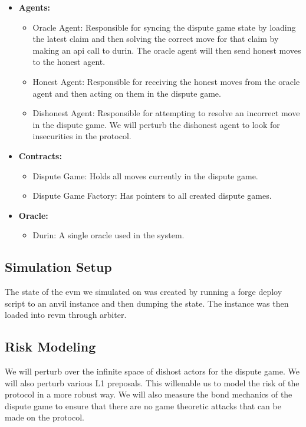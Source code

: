 \documentclass[14pt]{extarticle}
\begin{document}
\begin{itemize}
\item \textbf{Agents:}
  \begin{itemize}
  \item Oracle Agent: Responsible for syncing the dispute game state by loading the latest claim and then solving the correct move for that claim by making an api call to durin. The oracle agent will then send honest moves to the honest agent.
  \item Honest Agent: Responsible for receiving the honest moves from the oracle agent and then acting on them in the dispute game.
  \item Dishonest Agent: Responsible for attempting to resolve an incorrect move in the dispute game. We will perturb the dishonest agent to look for insecurities in the protocol.
  \end{itemize}
\item \textbf{Contracts:}
  \begin{itemize}
  \item Dispute Game: Holds all moves currently in the dispute game.
  \item Dispute Game Factory: Has pointers to all created dispute games.
  \end{itemize}
\item \textbf{Oracle:}
  \begin{itemize}
  \item Durin: A single oracle used in the system.
  \end{itemize}
\end{itemize}


\subsection{Simulation Setup}\label{simulation-setup}
The state of the evm we simulated on was created by running a forge deploy script to an anvil instance and then dumping the state. The instance was then loaded into revm through arbiter.

\subsection{Risk Modeling}\label{risk-modeling}

We will perturb over the infinite space of dishost actors for the
dispute game. We will also perturb various L1 preposals. This willenable us to model the risk of the protocol in a more robust way. We will also measure the bond mechanics of the dispute game to ensure that there are no game theoretic attacks that can be made on the protocol.
\end{document}
